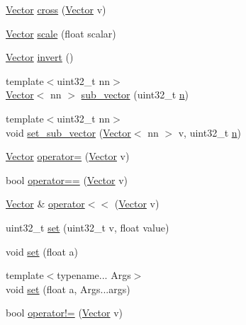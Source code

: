 \begin{DoxyCompactItemize}
\item 
\hyperlink{classetk_1_1_vector}{Vector} \hyperlink{classetk_1_1_vector_aa9ab624901a330e48c44e5e16d5c5b4a}{cross} (\hyperlink{classetk_1_1_vector}{Vector} v)
\item 
\hyperlink{classetk_1_1_vector}{Vector} \hyperlink{classetk_1_1_vector_a0cc9e62beeb30398ab5102a8a21d3ad0}{scale} (float scalar)
\item 
\hyperlink{classetk_1_1_vector}{Vector} \hyperlink{classetk_1_1_vector_aaf944f75926a97454beffc04250f3a7e}{invert} ()
\item 
{\footnotesize template$<$uint32\-\_\-t nn$>$ }\\\hyperlink{classetk_1_1_vector}{Vector}$<$ nn $>$ \hyperlink{classetk_1_1_vector_a917188a6ce6041488c60d24e6f49b891}{sub\-\_\-vector} (uint32\-\_\-t \hyperlink{classetk_1_1_vector_adc7028cab173d941591af508a7611325}{n})
\item 
{\footnotesize template$<$uint32\-\_\-t nn$>$ }\\void \hyperlink{classetk_1_1_vector_a31d290f05c2722bd5b8f7c9ab15680cc}{set\-\_\-sub\-\_\-vector} (\hyperlink{classetk_1_1_vector}{Vector}$<$ nn $>$ v, uint32\-\_\-t \hyperlink{classetk_1_1_vector_adc7028cab173d941591af508a7611325}{n})
\item 
\hyperlink{classetk_1_1_vector}{Vector} \hyperlink{classetk_1_1_vector_ab1d80b27412c4a4e4c5db82deaf93a5a}{operator=} (\hyperlink{classetk_1_1_vector}{Vector} v)
\item 
bool \hyperlink{classetk_1_1_vector_a7467a01d00015cfccacbdeca107dc224}{operator==} (\hyperlink{classetk_1_1_vector}{Vector} v)
\item 
\hyperlink{classetk_1_1_vector}{Vector} \& \hyperlink{classetk_1_1_vector_a15fc3f99b711d1b17920c658a204b783}{operator$<$$<$} (\hyperlink{classetk_1_1_vector}{Vector} v)
\item 
uint32\-\_\-t \hyperlink{classetk_1_1_vector_a8f64090a4fd857cc2769e4803f8159c0}{set} (uint32\-\_\-t v, float value)
\item 
void \hyperlink{classetk_1_1_vector_aea42c446a666b7897dd1ed547505cd08}{set} (float a)
\item 
{\footnotesize template$<$typename... Args$>$ }\\void \hyperlink{classetk_1_1_vector_a2798a7d73170fc7cfa74e9d37b6127be}{set} (float a, Args...\-args)
\item 
bool \hyperlink{classetk_1_1_vector_a7bafdba4ca50aa40d06dfd6fd99db339}{operator!=} (\hyperlink{classetk_1_1_vector}{Vector} v)
\item 

\end{DoxyCompactItemize}
